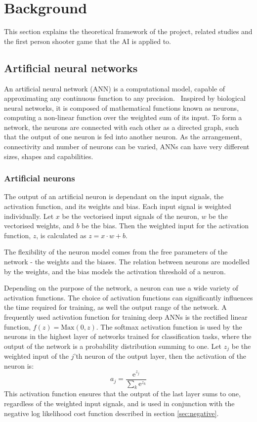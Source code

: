 
\section{Background}
\label{sec:background}
This section explains the theoretical framework of the project, related studies and the first person shooter game that the AI is applied to.

\subsection{Artificial neural networks}
An artificial neural network (ANN) is a computational model, capable of approximating any continuous function to any precision.~\cite{kurt} Inspired by biological neural networks, it is composed of mathematical functions known as neurons, computing a non-linear function over the weighted sum of its input. To form a network, the neurons are connected with each other as a directed graph, such that the output of one neuron is fed into another neuron. As the arrangement, connectivity and number of neurons can be varied, ANNs can have very different sizes, shapes and capabilities.

\subsubsection{Artificial neurons}
The output of an artificial neuron is dependant on the input signals, the activation function, and its weights and bias. Each input signal is weighted individually. Let $x$ be the vectorised input signals of the neuron, $w$ be the vectorised weights, and $b$ be the bias. Then the weighted input for the activation function, $z$, is calculated as $z = x \cdot w + b$.

The flexibility of the neuron model comes from the free parameters of the network - the weights and the biases. The relation between neurons are modelled by the weights, and the bias models the activation threshold of a neuron.

Depending on the purpose of the network, a neuron can use a wide variety of activation functions. The choice of activation functions can significantly influences the time required for training, as well the output range of the network. A frequently used activation function for training deep ANNs is the rectified linear function, $f(z) = \text{Max}(0,z)$. The softmax activation function is used by the neurons in the highest layer of networks trained for classification tasks, where the output of the network is a probability distribution summing to one. Let $z_j$ be the weighted input of the $j$'th neuron of the output layer, then the activation of the neuron is:
$$a_j = \frac{ \text{e}^{z_j} }{ \sum_{k} \text{e}^{z_k} }$$
This activation function ensures that the output of the last layer sums to one, regardless of the weighted input signals, and is used in conjunction with the negative log likelihood cost function described in section \ref{sec:negative}.

